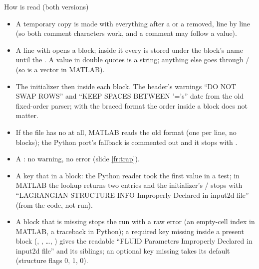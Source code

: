 \documentclass[aspectratio=169,11pt]{beamer}
\begin{document}
\begin{frame}{How  is read (both versions)}
\label{fr:parser}
\scriptsize
\begin{itemize}
  \item A temporary copy is made with everything after a \code{\%} or a \code{\#} removed, line by line (so both comment characters work, and a comment may follow a value).
  \item A line with \code{\{} opens a block; inside it every  is stored under the block's name until the \code{\}}. A value in double quotes is a string; anything else goes through / (so \code{[8.7e-4 8.7e-4]} is a vector in MATLAB).
  \item The initializer then  inside each block. The header's warnings ``DO NOT SWAP ROWS'' and ``KEEP SPACES BETWEEN '='s'' date from the old fixed-order parser; with the braced format the order inside a block does not matter.
  \item If the file has no \code{\{} at all, MATLAB reads the old format (one  per line, no blocks); the Python port's fallback is commented out and it stops with .
  \item A : no warning, no error (slide \ref{fr:trap}).
  \item A key that  in a block: the Python reader took the first value in a test; in MATLAB the lookup returns two entries and the initializer's / stops with ``LAGRANGIAN STRUCTURE INFO Improperly Declared in input2d file'' (from the code, not run).
  \item A block that is missing stops the run with a raw error (an empty-cell index in MATLAB, a  traceback in Python); a required key missing inside a present block (, ,  \ldots, ) gives the readable ``FLUID Parameters Improperly Declared in input2d file'' and its siblings; an optional key missing takes its default (structure flags 0,  1,  0).
\end{itemize}
\end{frame}
\end{document}
